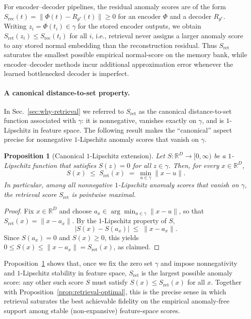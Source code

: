 \documentclass{article}
\theoremstyle{plain}
\newtheorem{proposition}[theorem]{Proposition}
\theoremstyle{definition}
\theoremstyle{remark}
\begin{document}
For encoder--decoder pipelines, the residual anomaly scores are of the
form $S_{\mathrm{rec}}(t) = \|\Phi(t) - R_{\theta^*}(t)\|\ge 0$ for an
encoder $\Phi$ and a decoder $R_{\theta^*}$. Writing
$z_i = \Phi(t_i)\in\gamma$ for the stored encoder outputs, we obtain
$S_{\mathrm{ret}}(z_i) \le S_{\mathrm{rec}}(t_i)$ for all $i$, i.e.,
retrieval never assigns a larger anomaly score to any stored normal
embedding than the reconstruction residual. Thus $S_{\mathrm{ret}}$
saturates the smallest possible empirical normal-score on the memory
bank, while encoder--decoder methods incur additional approximation
error whenever the learned bottlenecked decoder is imperfect.

\paragraph{A canonical distance-to-set property.}
In Sec.~\ref{sec:why-retrieval} we referred to $S_{\mathrm{ret}}$ as the
canonical distance-to-set function associated with $\gamma$: it is
nonnegative, vanishes exactly on $\gamma$, and is $1$-Lipschitz in
feature space. The following result makes the “canonical” aspect precise
for nonnegative $1$-Lipschitz anomaly scores that vanish on $\gamma$.

\begin{proposition}[Canonical $1$-Lipschitz extension]
\label{prop:canonical-distance}
Let $S:\mathbb{R}^D\to[0,\infty)$ be a $1$-Lipschitz function that
satisfies $S(z)=0$ for all $z\in\gamma$. Then, for every
$x\in\mathbb{R}^D$,
\begin{equation}
    S(x)
    \;\le\;
    S_{\mathrm{ret}}(x)
    \;=\;
    \min_{u\in\gamma}\|x-u\|.
\end{equation}
In particular, among all nonnegative $1$-Lipschitz anomaly scores that
vanish on $\gamma$, the retrieval score $S_{\mathrm{ret}}$ is
pointwise maximal.
\end{proposition}

\begin{proof}
Fix $x\in\mathbb{R}^D$ and choose
$a_x\in\arg\min_{u\in\gamma}\|x-u\|$, so that
$S_{\mathrm{ret}}(x)=\|x-a_x\|$. By the $1$-Lipschitz property of $S$,
\begin{equation}
    |S(x) - S(a_x)|
    \;\le\; \|x-a_x\|.
\end{equation}
Since $S(a_x)=0$ and $S(x)\ge 0$, this yields
$0\le S(x)\le \|x-a_x\| = S_{\mathrm{ret}}(x)$, as claimed.
\end{proof}

Proposition~\ref{prop:canonical-distance} shows that, once we fix the
zero set $\gamma$ and impose nonnegativity and $1$-Lipschitz stability
in feature space, $S_{\mathrm{ret}}$ is the largest possible anomaly
score: any other such score $S$ must satisfy $S(x)\le
S_{\mathrm{ret}}(x)$ for all $x$. Together with
Proposition~\ref{prop:retrieval-optimal}, this is the precise sense in
which retrieval saturates the best achievable fidelity on the
empirical anomaly-free support among stable (non-expansive) feature-space scores.
\end{document}
